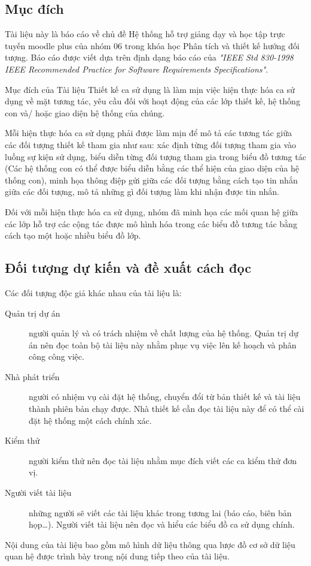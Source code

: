 \documentclass[./../main_file.tex]{subfiles}
\begin{document}
\subsection{Mục đích}

Tài liệu này là báo cáo về chủ đề Hệ thống hỗ trợ giảng dạy và học tập trực tuyến moodle plus của nhóm 06 trong khóa học Phân tích và thiết kế hướng đối tượng.
Báo cáo được viết dựa trên định dạng báo cáo của  \textit{"IEEE Std 830-1998 IEEE Recommended Practice for Software Requirements Specifications"}.


Mục đích của Tài liệu Thiết kế ca sử dụng là làm mịn việc hiện thực hóa ca sử dụng về mặt tương tác, yêu cầu đối với hoạt động của các lớp thiết kế, hệ thống con và/ hoặc giao diện hệ thống của chúng.


Mỗi hiện thực hóa ca sử dụng phải được làm mịn để mô tả các tương tác giữa các đối tượng thiết kế tham gia như sau: xác định từng đối tượng tham gia vào luồng sự kiện sử dụng, biểu diễn từng đối tượng tham gia trong biểu đồ  tương tác (Các hệ thống con có thể được biểu diễn bằng các thể hiện của giao diện của hệ thống con), minh họa thông điệp gửi giữa các đối tượng bằng cách tạo tin nhắn giữa các đối tượng, mô tả những gì đối tượng làm khi nhận được tin nhắn.


Đối với mỗi hiện thực hóa ca sử dụng, nhóm đã minh họa các mối quan hệ giữa các lớp hỗ trợ các cộng tác được mô hình hóa trong các biểu đồ tương tác bằng cách tạo một hoặc nhiều biểu đồ lớp.



\subsection{Đối tượng dự kiến và đề xuất cách đọc}

Các đối tượng độc giả khác nhau của tài liệu là:
\begin{description}
	\item[Quản trị dự án] người quản lý và có trách nhiệm về chất lượng của hệ thống. Quản trị dự án nên đọc toàn bộ tài liệu này nhằm phục vụ việc lên kế hoạch và phân công công việc.
	\item[Nhà phát triển] người có nhiệm vụ cài đặt hệ thống, chuyển đổi từ bản thiết kế và tài liệu thành phiên bản chạy được. Nhà thiết kế cần đọc tài liệu này để có thể cài đặt hệ thống một cách chính xác.
	\item[Kiểm thử] người kiểm thử nên đọc tài liệu nhằm mục đích viết các ca kiểm thử đơn vị.
	\item[Người viết tài liệu] những người sẽ viết các tài liệu khác trong tương lai (báo cáo, biên bản họp…). Người viết tài liệu nên đọc và hiểu các biểu đồ ca sử dụng chính.
\end{description}
	Nội dung của tài liệu bao gồm mô hình dữ liệu thông qua lược đồ cơ sở dữ liệu quan hệ được trình bày trong nội dung tiếp theo của tài liệu.
\end{document}
